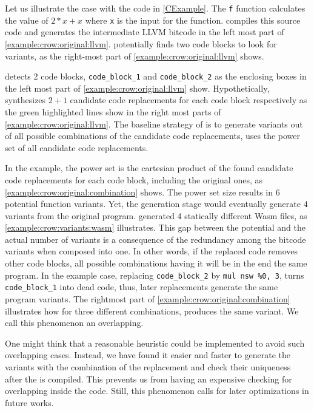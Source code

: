 Let us illustrate the case with the code in \autoref{CExample}. The \texttt{f} function calculates the value of $2 * x + x$ where \texttt{x} is the input for the function.  compiles this source code and generates the intermediate LLVM bitcode in the left most part of \autoref{example:crow:original:llvm}. potentially finds two code blocks to look for variants, as the right-most part of \autoref{example:crow:original:llvm} shows.



detects 2 code blocks, \texttt{code\_block\_1} and \texttt{code\_block\_2} as the enclosing boxes in the left most part of \autoref{example:crow:original:llvm} show. Hypothetically, synthesizes $2 + 1$ candidate code replacements for each code block respectively as the green highlighted lines show in the right most parts of \autoref{example:crow:original:llvm}.
The baseline strategy of is to generate variants out of all possible combinations of the candidate code replacements, \ie uses the power set of all candidate code replacements.

In the example, the power set is the cartesian product of the found candidate code replacements for each code block, including the original ones, as \autoref{example:crow:original:combination} shows. The power set size results in $6$ potential function variants. Yet, the generation stage would eventually generate $4$ variants from the original program. generated 4 statically different Wasm files, as \autoref{example:crow:variants:wasm} illustrates. This gap between the potential and the actual number of variants is a consequence of the redundancy among the bitcode variants when composed into one. In other words, if the replaced code removes other code blocks, all possible combinations having it will be in the end the same program. In the example case, replacing \texttt{code\_block\_2} by \texttt{mul nsw \%0, 3}, turns \texttt{code\_block\_1} into dead code, thus, later replacements generate the same program variants. The rightmost part of \autoref{example:crow:original:combination} illustrates how for three different combinations, produces the same variant. We call this phenomenon an overlapping.



One might think that a reasonable heuristic could be implemented to avoid such overlapping cases. Instead, we have found it easier and faster to generate the variants with the combination of the replacement and check their uniqueness after the is compiled. This prevents us from having an expensive checking for overlapping inside the code. Still, this phenomenon calls for later optimizations in future works.
